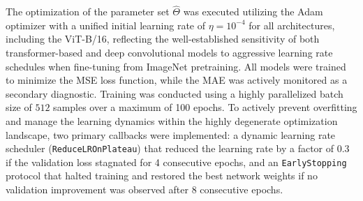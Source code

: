 \documentclass[final,5p,times,twocolumn]{elsarticle}
\begin{document}
\begin{table}[t!]
\centering
\caption{Configuration of evaluated deep learning 
architectures for inverse Hamiltonian parameter 
estimation. All models share a standardized regularized 
regression head mapped to the $\breve{P}=8$-dimensional 
physical parameter space. BN: Batch Normalization; 
Drop($p$): Dropout with rate $p$.}
\label{tab:model_config}
\end{table}

The optimization of the parameter set $\hat{\Theta}$ 
was executed utilizing the Adam optimizer with a 
unified initial learning rate of $\eta = 10^{-4}$ 
for all architectures, including the ViT-B/16, 
reflecting the well-established sensitivity of both 
transformer-based and deep convolutional models to 
aggressive learning rate schedules when fine-tuning 
from ImageNet pretraining. All models were trained 
to minimize the MSE loss function, while the MAE 
was actively monitored as a secondary diagnostic. 
Training was conducted using a highly parallelized 
batch size of $512$ samples over a maximum of 
100 epochs. To actively prevent overfitting and 
manage the learning dynamics within the highly 
degenerate optimization landscape, two primary 
callbacks were implemented: a dynamic learning 
rate scheduler (\texttt{ReduceLROnPlateau}) that 
reduced the learning rate by a factor of 0.3 if 
the validation loss stagnated for 4 consecutive 
epochs, and an \texttt{EarlyStopping} protocol 
that halted training and restored the best network 
weights if no validation improvement was observed 
after 8 consecutive epochs.
\end{document}
